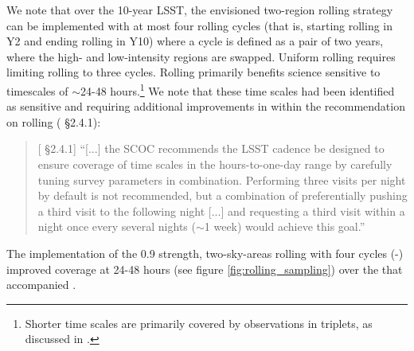 We note that over the 10-year LSST, the envisioned two-region rolling strategy can be implemented with at most four rolling cycles (that is, starting rolling in Y2 and ending rolling in Y10) where a cycle is defined as a pair of two years, where the high- and low-intensity regions are swapped. Uniform rolling requires limiting rolling to three cycles. Rolling primarily benefits science sensitive to timescales of \mbox{$\sim$24-48} hours.\footnote{Shorter time scales are primarily covered by observations in triplets, as discussed in .} 
We note that these time scales had been identified as sensitive and requiring additional improvements in  within the recommendation on rolling ( \S2.4.1): 

\begin{quote}
    {[ \S2.4.1] ``[...] the SCOC recommends the LSST cadence be designed to ensure coverage of time scales in the hours-to-one-day range by carefully tuning survey parameters in combination. Performing three visits per night by default is not recommended, but a combination of preferentially pushing a third visit to the following night [...] and requesting a third visit within a night once every several nights (\mbox{$\sim$1} week) would achieve this goal.'' }
\end{quote}

The implementation of the 0.9 strength, two-sky-areas rolling with four cycles (-) improved coverage at 24-48 hours (see figure \autoref{fig:rolling_sampling}) over the  that accompanied .


